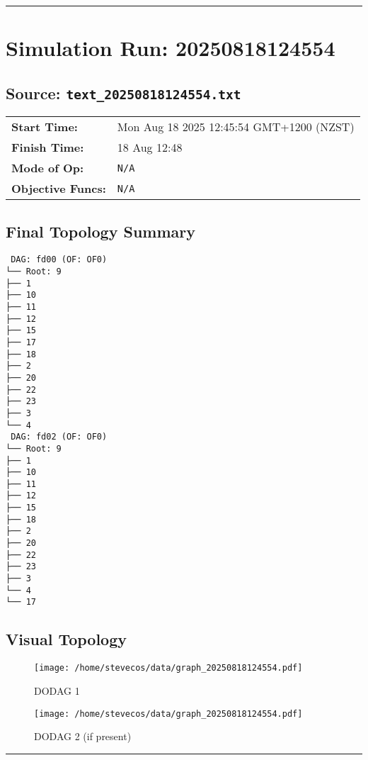\documentclass[a4paper]{article}
\begin{document}
\hrule
\clearpage


\section*{Simulation Run: 20250818124554}
\subsection*{Source: \texttt{text\_20250818124554.txt}}

\begin{tabular}{@{}ll}
\textbf{Start Time:} & Mon Aug 18 2025 12:45:54 GMT+1200 (NZST) \\
\textbf{Finish Time:} & 18 Aug 12:48 \\
\textbf{Mode of Op:} & \texttt{N/A} \\
\textbf{Objective Funcs:} & \texttt{N/A} \\
\end{tabular}

\subsection*{Final Topology Summary}
\begin{lstlisting}
 DAG: fd00 (OF: OF0)
└── Root: 9
├── 1
├── 10
├── 11
├── 12
├── 15
├── 17
├── 18
├── 2
├── 20
├── 22
├── 23
├── 3
└── 4
 DAG: fd02 (OF: OF0)
└── Root: 9
├── 1
├── 10
├── 11
├── 12
├── 15
├── 18
├── 2
├── 20
├── 22
├── 23
├── 3
└── 4
└── 17
\end{lstlisting}

\subsection*{Visual Topology}
\begin{figure}[h!]
    \centering
    \begin{minipage}{0.48\textwidth}
        \centering
        \texttt{[image: /home/stevecos/data/graph\_20250818124554.pdf]}
        \caption*{DODAG 1}
    \end{minipage}
    \hfill
    \begin{minipage}{0.48\textwidth}
        \centering
        \texttt{[image: /home/stevecos/data/graph\_20250818124554.pdf]}
        \caption*{DODAG 2 (if present)}
    \end{minipage}
\end{figure}

\hrule
\clearpage
\end{document}
